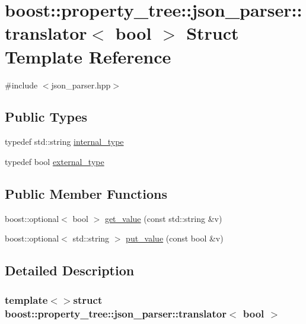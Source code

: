 \hypertarget{structboost_1_1property__tree_1_1json__parser_1_1translator_3_01bool_01_4}{\section{boost\-:\-:property\-\_\-tree\-:\-:json\-\_\-parser\-:\-:translator$<$ bool $>$ Struct Template Reference}
\label{structboost_1_1property__tree_1_1json__parser_1_1translator_3_01bool_01_4}
}


{\ttfamily \#include $<$json\-\_\-parser.\-hpp$>$}

\subsection*{Public Types}
\begin{DoxyCompactItemize}
\item 
typedef std\-::string \hyperlink{structboost_1_1property__tree_1_1json__parser_1_1translator_3_01bool_01_4_afb06d7dd56a70ab4a34df47427f9498d}{internal\-\_\-type}
\item 
typedef bool \hyperlink{structboost_1_1property__tree_1_1json__parser_1_1translator_3_01bool_01_4_a735dcf537d03fd03712c193e56de30bc}{external\-\_\-type}
\end{DoxyCompactItemize}
\subsection*{Public Member Functions}
\begin{DoxyCompactItemize}
\item 
boost\-::optional$<$ bool $>$ \hyperlink{structboost_1_1property__tree_1_1json__parser_1_1translator_3_01bool_01_4_a8e1c4f5fe17ec4a1a4bfd9acadc99403}{get\-\_\-value} (const std\-::string \&v)
\item 
boost\-::optional$<$ std\-::string $>$ \hyperlink{structboost_1_1property__tree_1_1json__parser_1_1translator_3_01bool_01_4_afb6097b473b4da99966191d43317ad64}{put\-\_\-value} (const bool \&v)
\end{DoxyCompactItemize}


\subsection{Detailed Description}
\subsubsection*{template$<$$>$struct boost\-::property\-\_\-tree\-::json\-\_\-parser\-::translator$<$ bool $>$}



